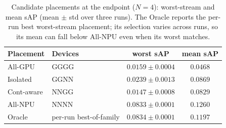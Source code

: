 \begin{table}[tb]
\centering
\caption{Candidate placements at the \Lvlm{} endpoint ($N{=}4$): worst-stream and mean sAP (mean $\pm$ std over three runs). The Oracle reports the per-run best worst-stream placement; its selection varies across runs, so its mean can fall below All-NPU even when its worst matches.}
\label{tab:e1-vlm-candidates}
\setlength{\tabcolsep}{6pt}
\begin{tabular}{llcc}
\toprule
Placement & Devices & worst sAP & mean sAP \\
\midrule
All-GPU & GGGG & $0.0159\pm0.0004$ & $0.0468$ \\
Isolated & GGNN & $0.0239\pm0.0013$ & $0.0869$ \\
Cont-aware & NNGG & $0.0147\pm0.0008$ & $0.0829$ \\
All-NPU & NNNN & $0.0833\pm0.0001$ & $0.1260$ \\
Oracle & per-run best-of-family & $0.0834\pm0.0001$ & $0.1197$ \\
\bottomrule
\end{tabular}
\end{table}
